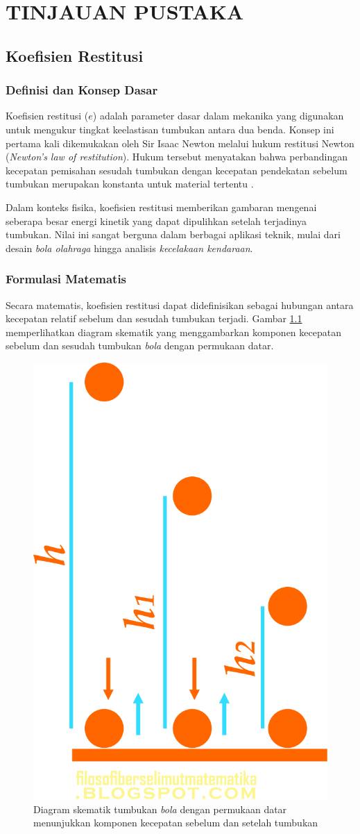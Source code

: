 \chapter{TINJAUAN PUSTAKA}

\section{Koefisien Restitusi}

\subsection{Definisi dan Konsep Dasar}
Koefisien restitusi ($e$) adalah parameter dasar dalam mekanika yang digunakan untuk mengukur tingkat keelastisan tumbukan antara dua benda. Konsep ini pertama kali dikemukakan oleh Sir Isaac Newton melalui hukum restitusi Newton (\textit{Newton's law of restitution}). Hukum tersebut menyatakan bahwa perbandingan kecepatan pemisahan sesudah tumbukan dengan kecepatan pendekatan sebelum tumbukan merupakan konstanta untuk material tertentu \citep{goldsmith1999theory}.

Dalam konteks fisika, koefisien restitusi memberikan gambaran mengenai seberapa besar energi kinetik yang dapat dipulihkan setelah terjadinya tumbukan. Nilai ini sangat berguna dalam berbagai aplikasi teknik, mulai dari desain \textit{bola olahraga} hingga analisis \textit{kecelakaan kendaraan}.

\subsection{Formulasi Matematis}
Secara matematis, koefisien restitusi dapat didefinisikan sebagai hubungan antara kecepatan relatif sebelum dan sesudah tumbukan terjadi. Gambar \ref{fig:teori-figure-1} memperlihatkan diagram skematik yang menggambarkan komponen kecepatan sebelum dan sesudah tumbukan \textit{bola} dengan permukaan datar.

\begin{figure}
    \centering
    \includegraphics[width=0.3\linewidth]{images/gambar restitusi.png}
    \caption{Diagram skematik tumbukan \textit{bola} dengan permukaan datar menunjukkan komponen kecepatan sebelum dan setelah tumbukan}
    \label{fig:teori-figure-1}
\end{figure}

